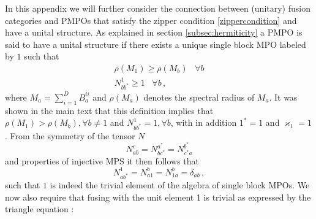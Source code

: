 \documentclass[12 pt]{article}
\begin{document}
In this appendix we will further consider the connection between (unitary) fusion categories and PMPOs that satisfy the zipper condition \eqref{zippercondition} and have a unital structure. As explained in section \ref{subsec:hermiticity} a PMPO is said to have a unital structure if there exists a unique single block MPO labeled by $1$ such that
\begin{eqnarray}
    \rho(M_1) \geq \rho(M_b)\;\;\;\forall b\\
    N^1_{bb^*} \geq 1\;\;\;\forall b\, ,
\end{eqnarray}
where $M_a = \sum_{i=1}^D B_a^{ii}$ and $\rho(M_a)$ denotes the spectral radius of $M_a$. It was shown in the main text that this definition implies that $\rho(M_1) > \rho(M_b), \forall b\neq 1$ and $N^1_{bb^*} = 1, \forall b$, with in addition $1^* = 1$ and $\varkappa_1 = 1$. From the symmetry of the tensor $N$
\begin{equation}
    N^c_{ab} = N^{a^*}_{bc^*} = N_{c^*a}^{b^*}
\end{equation}
and properties of injective MPS it then follows that
\begin{equation}
    N_{ab^*}^1 = N^b_{a1} = N^b_{1a} = \delta_{ab}\, ,
\end{equation}
such that $1$ is indeed the trivial element of the algebra of single block MPOs. We now also require that fusing with the unit element 1 is trivial as expressed by the triangle equation \cite{Kitaev06}:
\end{document}
